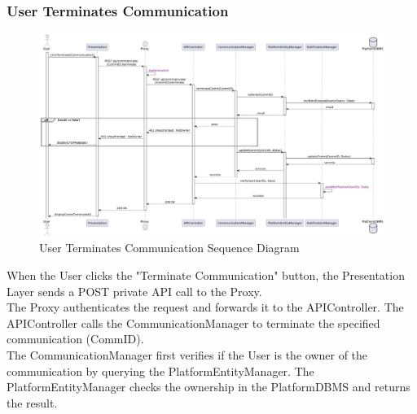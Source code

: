 
\subsubsection*{User Terminates Communication}
\begin{figure}[H]
    \centering
    \includegraphics[width=\linewidth]{Latex/Images/DD/SequenceDiagrams/20UserTerminatesCommunication.png}
    \caption{User Terminates Communication Sequence Diagram}
    \label{fig:ustermcomm}
\end{figure}
When the User clicks the "Terminate Communication" button, the Presentation Layer sends a POST private API call to the Proxy.\\
The Proxy authenticates the request and forwards it to the APIController. The APIController calls the CommunicationManager to terminate the specified communication (CommID).\\
The CommunicationManager first verifies if the User is the owner of the communication by querying the PlatformEntityManager. The PlatformEntityManager checks the ownership in the PlatformDBMS and returns the result.\\
